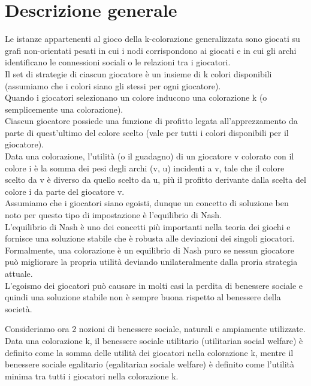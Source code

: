 \section{Descrizione generale}
\justify
Le istanze appartenenti al gioco della k-colorazione generalizzata sono giocati su grafi non-orientati pesati in cui i nodi corrispondono ai giocati e in cui gli archi identificano le connessioni sociali o le relazioni tra i giocatori.\\
Il set di strategie di ciascun giocatore è un insieme di k colori disponibili (assumiamo che i colori siano gli stessi per ogni giocatore).\\
Quando i giocatori selezionano un colore inducono una colorazione k (o semplicemente una colorazione).\\
Ciascun giocatore possiede una funzione di profitto legata all'apprezzamento da parte di quest'ultimo del colore scelto (vale per tutti i colori disponibili per il giocatore).\\
Data una colorazione, l'utilità (o il guadagno) di un giocatore v colorato con il colore i è la somma dei pesi degli archi (v, u) incidenti a v, tale che il colore scelto da v è diverso da quello scelto da u, più il profitto derivante dalla scelta del colore i da parte del giocatore v.\\
Assumiamo che i giocatori siano egoisti, dunque un concetto di soluzione ben noto per questo tipo di impostazione è l'equilibrio di Nash.\\
L'equilibrio di Nash è uno dei concetti più importanti nella teoria dei giochi e fornisce una soluzione stabile che è robusta alle deviazioni dei singoli giocatori.\\
Formalmente, una colorazione è un equilibrio di Nash puro se nessun giocatore può migliorare la propria utilità deviando unilateralmente dalla proria strategia attuale.\\
L'egoismo dei giocatori può causare in molti casi la perdita di benessere sociale e quindi una soluzione stabile non è sempre buona rispetto al benessere della società.\newline

Consideriamo ora 2 nozioni di benessere sociale, naturali e ampiamente utilizzate.\\
Data una colorazione k, il benessere sociale utilitario (utilitarian social welfare) è definito come la somma delle utilità dei giocatori nella colorazione k, mentre il benessere sociale egalitario (egalitarian sociale welfare) è definito come l'utilità minima tra tutti i giocatori nella colorazione k.\newline

